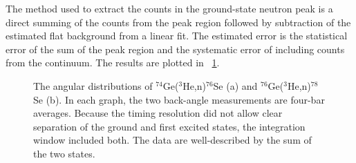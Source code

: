 The method used to extract the counts in the ground-state neutron peak is a direct summing of the counts from the peak region followed by subtraction of the estimated flat background from a linear fit.  The estimated error is the statistical error of the sum of the peak region and the systematic error of including counts from the continuum.  The results are plotted in {\fig}~\ref{fig:PS_angularDistribution}.
\begin{figure}[!htbp]
\centering
{}
\caption{The angular distributions of $^{74}$Ge($^3$He,n)$^{76}$Se (a) and $^{76}$Ge($^3$He,n)$^{78}$Se (b).  In each graph, the two back-angle measurements are four-bar averages.  Because the timing resolution did not allow clear separation of the ground and first excited states, the integration window included both.  The data are well-described by the sum of the two states.}
\label{fig:PS_angularDistribution}
\end{figure}


